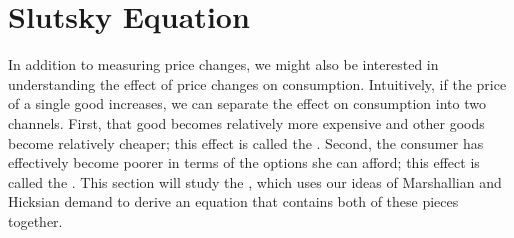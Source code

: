 \chapter{Slutsky Equation}

In addition to measuring price changes, we might also be interested in understanding the effect of price changes on consumption. Intuitively, if the price of a single good increases, we can separate the effect on consumption into two channels. First, that good becomes relatively more expensive and other goods become relatively cheaper; this effect is called the . Second, the consumer has effectively become poorer in terms of the options she can afford; this effect is called the . This section will study the , which uses our ideas of Marshallian and Hicksian demand to derive an equation that contains both of these pieces together.

